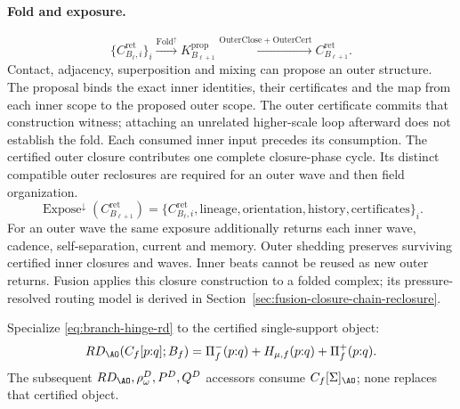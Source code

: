 \paragraph{Fold and exposure.}
\begin{equation}
\{C^{\mathrm{ret}}_{B_\ell,i}\}_i
\xrightarrow{\operatorname{Fold}^{\uparrow}}K^{\mathrm{prop}}_{B_{\ell+1}}
\xrightarrow{\mathrm{OuterClose}+\mathrm{OuterCert}}C^{\mathrm{ret}}_{B_{\ell+1}}.
\label{eq:fold-outer-closure}
\end{equation}
Contact, adjacency, superposition and mixing can propose an outer structure.
The proposal binds the exact inner identities, their certificates and the map
from each inner scope to the proposed outer scope. The outer certificate commits
that construction witness; attaching an unrelated higher-scale loop afterward
does not establish the fold. Each consumed inner input precedes its consumption.
The certified outer closure contributes one complete closure-phase cycle. Its distinct compatible
outer reclosures are required for an outer wave and then field organization.
\begin{equation}
\operatorname{Expose}^{\downarrow}(C^{\mathrm{ret}}_{B_{\ell+1}})
=\{C^{\mathrm{ret}}_{B_\ell,i},\mathrm{lineage},\mathrm{orientation},
\mathrm{history},\mathrm{certificates}\}_i.
\label{eq:expose-inner-lineage}
\end{equation}
For an outer wave the same exposure additionally returns each inner wave,
cadence, self-separation, current and memory. Outer shedding preserves
surviving certified inner closures and waves. Inner beats cannot be reused as
new outer returns. Fusion applies this closure construction to a folded
complex; its pressure-resolved routing model is derived in Section~\ref{sec:fusion-closure-chain-reclosure}.

Specialize \eqref{eq:branch-hinge-rd} to the certified single-support object:
\begin{equation}
RD_{\AO}\!\left(C_f[p{:}q];B_f\right)
=
\Pi^-_f(p{:}q)+H_{\mu,f}(p{:}q)+\Pi^+_f(p{:}q).
\label{eq:cycle-rd-accessor}
\end{equation}
The subsequent \(RD_{\AO},\rho^D_\omega,P^D,Q^D\) accessors consume
\(C_f[\Sigma]_{\AO}\); none replaces that certified object.

